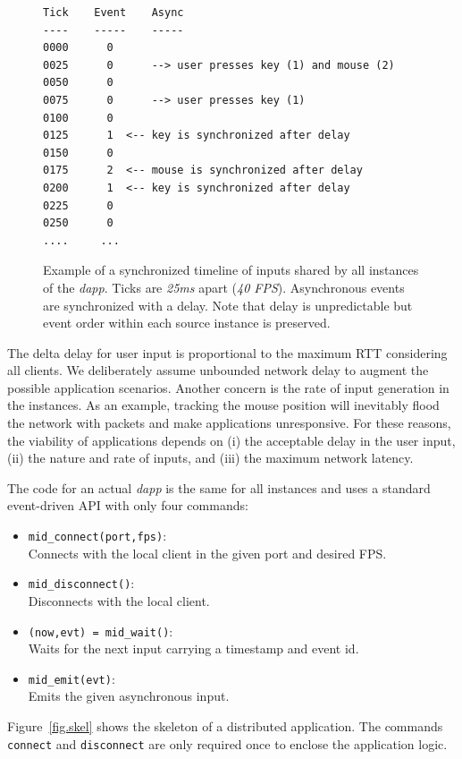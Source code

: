 \documentclass[sigplan,screen]{acmart}
\newcommand{\dapp}{\emph{dapp}\xspace}
\begin{document}
\begin{figure}[t]
{\scriptsize
\begin{verbatim}
Tick    Event    Async
----    -----    -----
0000      0
0025      0      --> user presses key (1) and mouse (2)
0050      0
0075      0      --> user presses key (1)
0100      0
0125      1  <-- key is synchronized after delay
0150      0
0175      2  <-- mouse is synchronized after delay
0200      1  <-- key is synchronized after delay
0225      0
0250      0
....     ...
\end{verbatim}
}
  \caption{
    \label{fig.timeline}
    Example of a synchronized timeline of inputs shared by all instances of the
    \dapp.
    Ticks are \emph{25ms} apart (\emph{40 FPS}).
    Asynchronous events are synchronized with a delay.
    Note that delay is unpredictable but event order within each source
    instance is preserved.
  }
\end{figure}

The delta delay for user input is proportional to the maximum RTT considering
all clients.
We deliberately assume unbounded network delay to augment the possible
application scenarios.
Another concern is the rate of input generation in the instances.
As an example, tracking the mouse position will inevitably flood the network
with packets and make applications unresponsive.
For these reasons, the viability of applications depends on
    (i) the acceptable delay in the user input,
    (ii) the nature and rate of inputs, and
    (iii) the maximum network latency.

The code for an actual \dapp is the same for all instances and uses a standard
event-driven API with only four commands:
%
\begin{itemize}
\item \texttt{mid\_connect(port,fps)}:   \\Connects with the local client in the given port and desired FPS.
\item \texttt{mid\_disconnect()}:        \\Disconnects with the local client.
\item \texttt{(now,evt) = mid\_wait()}:  \\Waits for the next input carrying a timestamp and event id.
\item \texttt{mid\_emit(evt)}:           \\Emits the given asynchronous input.
\end{itemize}
%
Figure~\ref{fig.skel} shows the skeleton of a distributed application.
The commands \texttt{connect} and \texttt{disconnect} are only required once to
enclose the application logic.
\end{document}
